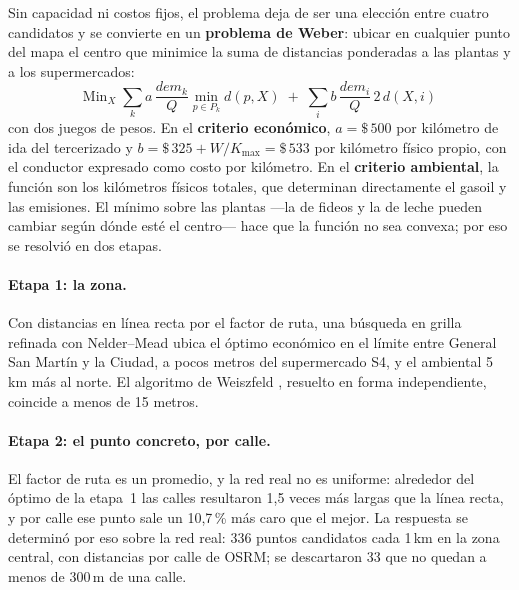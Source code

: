 \documentclass[10pt,a4paper]{article}
\begin{document}
Sin capacidad ni costos fijos, el problema deja de ser una elección entre
cuatro candidatos y se convierte en un \textbf{problema de Weber}: ubicar en
cualquier punto del mapa el centro que minimice la suma de distancias
ponderadas a las plantas y a los supermercados:
\[
\text{Min}_{X}\; \sum_k a\,\frac{\mathit{dem}_k}{Q} \min_{p \in P_k} d(p, X)
\;+\; \sum_i b\,\frac{\mathit{dem}_i}{Q}\, 2\, d(X, i)
\]
con dos juegos de pesos. En el \textbf{criterio económico}, $a = \$\,500$ por
kilómetro de ida del tercerizado y $b = \$\,325 + W/K_{\max} = \$\,533$ por
kilómetro físico propio, con el conductor expresado como costo por kilómetro.
En el \textbf{criterio ambiental}, la función son los kilómetros físicos
totales, que determinan directamente el gasoil y las emisiones. El mínimo sobre
las plantas —la de fideos y la de leche pueden cambiar según dónde esté el
centro— hace que la función no sea convexa; por eso se resolvió en dos etapas.

\paragraph{Etapa 1: la zona.} Con distancias en línea recta por el factor de
ruta, una búsqueda en grilla refinada con Nelder–Mead ubica el óptimo
económico en el límite entre General San Martín y la Ciudad, a pocos metros
del supermercado S4, y el ambiental 5\,km más al norte. El algoritmo de
Weiszfeld \cite{weiszfeld}, resuelto en forma independiente, coincide a menos
de 15 metros.

\paragraph{Etapa 2: el punto concreto, por calle.} El factor de ruta es un
promedio, y la red real no es uniforme: alrededor del óptimo de la etapa~1 las
calles resultaron 1,5 veces más largas que la línea recta, y por calle ese
punto sale un 10,7\,\% más caro que el mejor. La respuesta se determinó por
eso sobre la red real: 336 puntos candidatos cada 1\,km en la zona central,
con distancias por calle de OSRM; se descartaron 33 que no quedan a menos de
300\,m de una calle.
\end{document}
